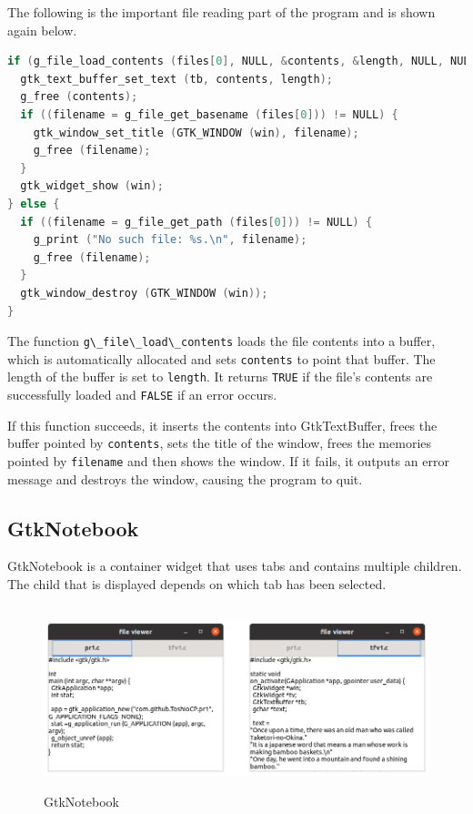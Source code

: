 The following is the important file reading part of the program and is
shown again below.

\begin{lstlisting}[language=C]
if (g_file_load_contents (files[0], NULL, &contents, &length, NULL, NULL)) {
  gtk_text_buffer_set_text (tb, contents, length);
  g_free (contents);
  if ((filename = g_file_get_basename (files[0])) != NULL) {
    gtk_window_set_title (GTK_WINDOW (win), filename);
    g_free (filename);
  }
  gtk_widget_show (win);
} else {
  if ((filename = g_file_get_path (files[0])) != NULL) {
    g_print ("No such file: %s.\n", filename);
    g_free (filename);
  }
  gtk_window_destroy (GTK_WINDOW (win));
}
\end{lstlisting}

The function \passthrough{\lstinline!g\_file\_load\_contents!} loads the
file contents into a buffer, which is automatically allocated and sets
\passthrough{\lstinline!contents!} to point that buffer. The length of
the buffer is set to \passthrough{\lstinline!length!}. It returns
\passthrough{\lstinline!TRUE!} if the file's contents are successfully
loaded and \passthrough{\lstinline!FALSE!} if an error occurs.

If this function succeeds, it inserts the contents into GtkTextBuffer,
frees the buffer pointed by \passthrough{\lstinline!contents!}, sets the
title of the window, frees the memories pointed by
\passthrough{\lstinline!filename!} and then shows the window. If it
fails, it outputs an error message and destroys the window, causing the
program to quit.

\hypertarget{gtknotebook}{%
\subsection{GtkNotebook}\label{gtknotebook}}

GtkNotebook is a container widget that uses tabs and contains multiple
children. The child that is displayed depends on which tab has been
selected.

\begin{figure}
\centering
\includegraphics[width=13.2cm,height=5.325cm]{../image/screenshot_gtk_notebook.png}
\caption{GtkNotebook}
\end{figure}

